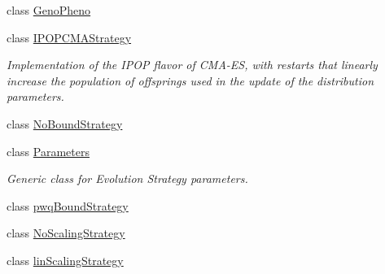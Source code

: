 \begin{DoxyCompactItemize}
class \hyperlink{classlibcmaes_1_1GenoPheno}{Geno\-Pheno}
\item 
class \hyperlink{classlibcmaes_1_1IPOPCMAStrategy}{I\-P\-O\-P\-C\-M\-A\-Strategy}
\begin{DoxyCompactList}\small\item\em Implementation of the I\-P\-O\-P flavor of C\-M\-A-\/\-E\-S, with restarts that linearly increase the population of offsprings used in the update of the distribution parameters. \end{DoxyCompactList}\item 
class \hyperlink{classlibcmaes_1_1NoBoundStrategy}{No\-Bound\-Strategy}
\item 
class \hyperlink{classlibcmaes_1_1Parameters}{Parameters}
\begin{DoxyCompactList}\small\item\em Generic class for Evolution Strategy parameters. \end{DoxyCompactList}\item 
class \hyperlink{classlibcmaes_1_1pwqBoundStrategy}{pwq\-Bound\-Strategy}
\item 
class \hyperlink{classlibcmaes_1_1NoScalingStrategy}{No\-Scaling\-Strategy}
\item 
class \hyperlink{classlibcmaes_1_1linScalingStrategy}{lin\-Scaling\-Strategy}
\end{DoxyCompactItemize}
